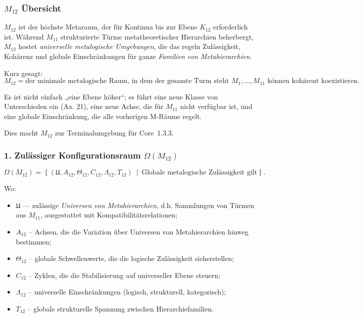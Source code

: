 

\subsubsection{$M_{12}$ Übersicht}
\label{sec:m12-overview}

$M_{12}$ ist der höchste Metaraum, der für Kontinua bis zur Ebene $K_{12}$ erforderlich ist.
Während $M_{11}$ strukturierte Türme metatheoretischer Hierarchien beherbergt,
$M_{12}$ hostet \emph{universelle metalogische Umgebungen}, die das regeln
Zulässigkeit, Kohärenz und globale Einschränkungen für ganze \emph{Familien von
Metahierarchien}.

Kurz gesagt:
\[
M_{12} = \text{der minimale metalogische Raum, in dem der gesamte Turm steht }
M_1, \ldots, M_{11} \text{ können kohärent koexistieren.}
\]

Es ist nicht einfach „eine Ebene höher“;
es führt eine neue Klasse von Unterschieden ein (Ax. 21),
eine neue Achse, die für $M_{11}$ nicht verfügbar ist,
und eine globale Einschränkung, die alle vorherigen M-Räume regelt.

Dies macht $M_{12}$ zur Terminalumgebung für Core~1.3.3.

\subsubsection*{1. Zulässiger Konfigurationsraum $\Omega(M_{12})$}

\[
\Omega(M_{12}) =
\left\{
\left( \mathfrak{U}, A_{12}, \Theta_{12},
C_{12}, \Lambda_{12}, T_{12} \right)
\ \middle|\
\text{Globale metalogische Zulässigkeit gilt}
\right\}.
\]

Wo:

\begin{itemize}
    \item $\mathfrak{U}$ — zulässige \emph{Universen von Metahierarchien},
          d.h. Sammlungen von Türmen aus $M_{11}$, ausgestattet mit Kompatibilitätsrelationen;
    \item $A_{12}$ – Achsen, die die Variation über Universen von Metahierarchien hinweg bestimmen;
    \item $\Theta_{12}$ – globale Schwellenwerte, die die logische Zulässigkeit sicherstellen;
    \item $C_{12}$ – Zyklen, die die Stabilisierung auf universeller Ebene steuern;
    \item $\Lambda_{12}$ – universelle Einschränkungen (logisch, strukturell, kategorisch);
    \item $T_{12}$ – globale strukturelle Spannung zwischen Hierarchiefamilien.
\end{itemize}

